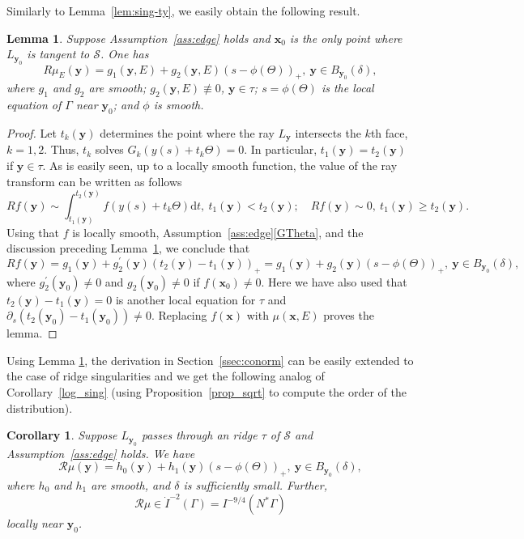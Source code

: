 \documentclass[11pt]{article}
\newcommand{\be}{\begin{equation}}
\newcommand{\ee}{\end{equation}}
\newcommand{\s}{\mathcal S}
\newcommand{\ed}{\tau}
\newcommand{\pa}{\partial}
\newcommand{\dd}{\mathrm{d}}
\numberwithin{equation}{section}
\newcommand{\vy}{\mathbf{y}}
\newcommand{\vx}{\mathbf{x}}
\newtheorem{lemma}[theorem]{Lemma}
\newtheorem{corollary}[theorem]{Corollary}
\theoremstyle{definition}
\begin{document}
Similarly to Lemma~\ref{lem:sing-ty}, we easily obtain the following result.

\begin{lemma}\label{lem:edge sing} Suppose Assumption~\ref{ass:edge} holds  and $\vx_0$ is the only point where $L_{\vy_0}$ is tangent to $\s$. One has 
\be
\label{dist_R edge}
R\mu_E(\vy) =  g_1(\vy,E) + g_2(\vy,E)(s - \phi(\Theta))_+,\ \vy\in B_{\vy_0}(\delta),
\ee
where $g_1$ and $g_2$ are smooth; $g_2(\vy,E) \not\equiv 0$, $\vy\in\tau$; $s = \phi(\Theta)$ is the local equation of $\Gamma$ near $\vy_0$; and $\phi$ is smooth.  
\end{lemma}

\begin{proof}
Let $t_k(\vy)$ determines the point where the ray $L_{\vy}$ intersects the $k$th face, $k=1,2$. Thus, $t_k$ solves $G_k(y(s)+t_k\Theta)=0$. In particular, $t_1(\vy)=t_2(\vy)$ if $\vy\in\ed$. As is easily seen, up to a locally smooth function, the value of the ray transform can be written as follows
\be
Rf(\vy)\sim\int_{t_1(\vy)}^{t_2(\vy)} f(y(s)+t_k\Theta)\dd t,\ t_1(\vy)<t_2(\vy);\quad
Rf(\vy)\sim 0,\ t_1(\vy)\ge t_2(\vy).
\ee
Using that $f$ is locally smooth, Assumption~\ref{ass:edge}\eqref{GTheta}, and the discussion preceding Lemma~\ref{lem:edge sing}, we conclude that
\be
\label{edge 1st}
Rf(\vy) =  g_1(\vy) + g_2^\prime(\vy)(t_2(\vy)-t_1(\vy))_+=  g_1(\vy) + g_2(\vy)(s - \phi(\Theta))_+,\ \vy\in B_{\vy_0}(\delta),
\ee
where $g_2^\prime(\vy_0)\neq0$ and $g_2(\vy_0)\neq0$ if $f(\vx_0)\neq0$. Here we have also used that $t_2(\vy)-t_1(\vy)=0$ is another local equation for $\ed$ and $\pa_s(t_2(\vy_0)-t_1(\vy_0))\neq 0$. Replacing $f(\vx)$ with $\mu(\vx,E)$ proves the lemma.
\end{proof}



Using Lemma \ref{lem:edge sing}, the derivation in Section~\ref{ssec:conorm} can be easily extended to the case of ridge singularities and we get the following analog of Corollary~\ref{log_sing} (using Proposition~\ref{prop_sqrt} to compute the order of the distribution). 

\begin{corollary}\label{cor:log_sing edge}
Suppose $L_{\vy_0}$ passes through an ridge $\ed$ of $\s$ and Assumption~\ref{ass:edge} holds. We have
\be
\label{sqrt_sing edge}
\mathcal{R}\mu(\vy) = h_0(\vy) + h_1(\vy) (s - \phi(\Theta))_+,\ \vy\in B_{\vy_0}(\delta),
\ee
where $h_0$ and $h_1$ are smooth, and $\delta$ is sufficiently small. Further,
\be\label{Rmu distr edge}
\mathcal{R}\mu \in \dot{I}^{-2}(\Gamma)=I^{-9/4}(N^*\Gamma)
\ee
locally near $\vy_0$.
\end{corollary}
\end{document}
